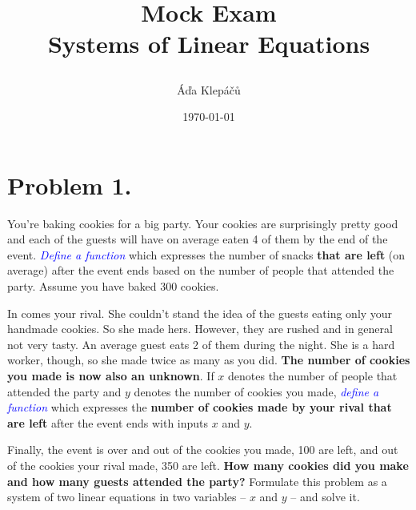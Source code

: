 \documentclass[a4paper,11pt]{article}
\title{\Huge\textsf{Mock Exam}\\
 \Large\textsf{Systems of Linear Equations}
 \author{Áďa Klepáčů}
 \date{\today}
}
\newcommand{\tb}{\textcolor{blue}}
\begin{document}
\maketitle
\thispagestyle{fancy}

\section*{Problem 1.}

You're baking cookies for a big party. Your cookies are surprisingly pretty good
and each of the guests will have on average eaten 4 of them by the end of the
event. \emph{\tb{Define a function}} which expresses the number of snacks
\textbf{that are left} (on average) after the event ends based on the number of
people that attended the party. Assume you have baked 300 cookies.

In comes your rival. She couldn't stand the idea of the guests eating only your
handmade cookies. So she made hers. However, they are rushed and in general not
very tasty. An average guest eats 2 of them during the night. She is a hard
worker, though, so she made twice as many as you did. \textbf{The number of
cookies you made is now also an unknown}. If $x$ denotes the number of people
that attended the party and $y$ denotes the number of cookies you made,
\emph{\tb{define a function}} which expresses the \textbf{number of cookies made
by your rival that are left} after the event ends with inputs $x$ and $y$.

Finally, the event is over and out of the cookies you made, 100 are left, and
out of the cookies your rival made, 350 are left. \textbf{How many cookies did
you make and how many guests attended the party?} Formulate this problem as a
system of two linear equations in two variables -- $x$ and $y$ -- and solve it.
\end{document}
